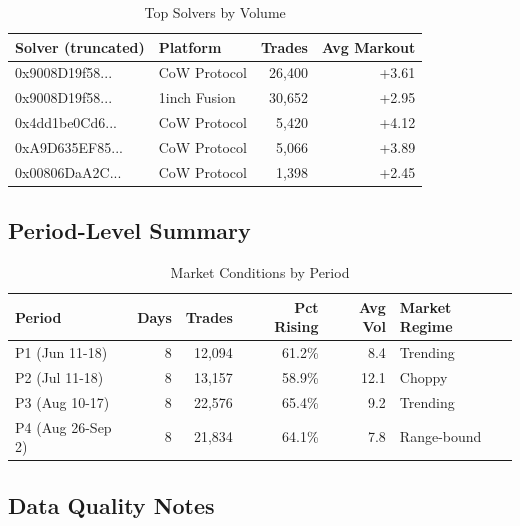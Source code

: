 \documentclass[12pt,a4paper]{article}
\begin{document}
\begin{table}[H]
\centering
\caption{Top Solvers by Volume}
\begin{tabular}{llrr}
\toprule
\textbf{Solver (truncated)} & \textbf{Platform} & \textbf{Trades} & \textbf{Avg Markout} \\
\midrule
0x9008D19f58... & CoW Protocol & 26,400 & +3.61 \\
0x9008D19f58... & 1inch Fusion & 30,652 & +2.95 \\
0x4dd1be0Cd6... & CoW Protocol & 5,420 & +4.12 \\
0xA9D635EF85... & CoW Protocol & 5,066 & +3.89 \\
0x00806DaA2C... & CoW Protocol & 1,398 & +2.45 \\
\bottomrule
\end{tabular}
\end{table}

\subsection{Period-Level Summary}

\begin{table}[H]
\centering
\caption{Market Conditions by Period}
\begin{tabular}{lrrrrl}
\toprule
\textbf{Period} & \textbf{Days} & \textbf{Trades} & \textbf{Pct Rising} & \textbf{Avg Vol} & \textbf{Market Regime} \\
\midrule
P1 (Jun 11-18) & 8 & 12,094 & 61.2\% & 8.4 & Trending \\
P2 (Jul 11-18) & 8 & 13,157 & 58.9\% & 12.1 & Choppy \\
P3 (Aug 10-17) & 8 & 22,576 & 65.4\% & 9.2 & Trending \\
P4 (Aug 26-Sep 2) & 8 & 21,834 & 64.1\% & 7.8 & Range-bound \\
\bottomrule
\end{tabular}
\end{table}

\subsection{Data Quality Notes}
\end{document}
